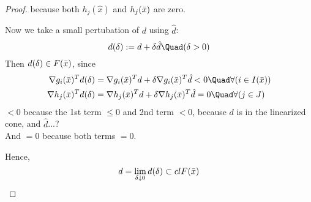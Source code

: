 \begin{proof}
	because both $h_j(\hat x)$ and $h_j(\bar x)$ are zero.

	Now we take a small pertubation of $d$ using $\hat d$:
	$$
		d(\delta):= d + \delta\hat d\Quad(\delta>0)
	$$
	Then $d(\delta)\in F(\bar x)$, since
	\begin{align*}
		\nabla g_i(\bx)^Td(\delta) & =\nabla g_i(\bx)^Td + \delta\nabla g_i(\bx)^T\hat d<0 \Quad\forall(i\in\Act) \\
		\nabla h_j(\bx)^Td(\delta) & =\nabla h_j(\bx)^Td + \delta\nabla h_j(\bx)^T\hat d=0 \Quad\forall(j\in J)
	\end{align*}
	$<0$ because the 1st term $\leq0$ and 2nd term $<0$, because $d$ is
	in the linearized cone, and $\hat d$...? \\
	And $=0$ because both terms $=0$.

	Hence,
	$$
		d=\lim_{\delta\downarrow0}d(\delta) \subset clF(\bar x)
	$$
\end{proof}
